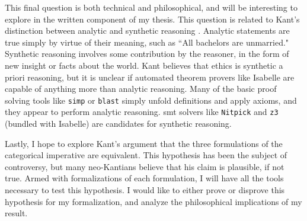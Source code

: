 \begin{isabellebody}
\begin{isamarkuptext}
This final question is both technical and philosophical, and will be interesting to explore in the written
component of my thesis. This question is related to Kant's distinction between analytic and synthetic reasoning \cite{groundwork}. 
Analytic statements are true simply by virtue of their meaning, such as ``All bachelors are unmarried." Synthetic 
reasoning involves some contribution by the reasoner, in the form of new insight or facts about the world. 
Kant believes that ethics is synthetic a priori reasoning, but it is unclear if automated theorem provers 
like Isabelle are capable of anything more than analytic reasoning. Many of the basic proof solving 
tools like \texttt{simp} or \texttt{blast} simply unfold definitions and apply axioms, and they appear to 
perform analytic reasoning. smt solvers like \texttt{Nitpick} and \texttt{z3} (bundled with Isabelle) are 
candidates for synthetic reasoning.

Lastly, I hope to explore Kant's argument that the three formulations of the categorical imperative are 
equivalent. This hypothesis has been the subject of controversy, but many neo-Kantians believe that his 
claim is plausible, if not true. Armed with formalizations of each formulation, I will have all the tools 
necessary to test this hypothesis. I would like to either prove or disprove this hypothesis
for my formalization, and analyze the philosophical implications of my result.%
\end{isamarkuptext}\isamarkuptrue%
%
\isadelimtheory
%
\endisadelimtheory
%
\isatagtheory
%
\endisatagtheory
{\isafoldtheory}%
%
\isadelimtheory
%
\endisadelimtheory
%
\end{isabellebody}%
\endinput

